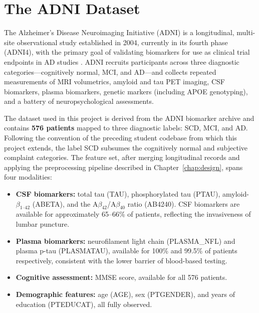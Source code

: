 \documentclass[12pt, a4paper]{report}
\begin{document}
  \section{The ADNI Dataset}
  \label{sec:adni}

  The Alzheimer's Disease Neuroimaging Initiative (ADNI) is a longitudinal,
  multi-site observational study established in 2004, currently in its fourth phase
  (ADNI4), with the primary goal of validating biomarkers for use as clinical trial
  endpoints in AD studies \citep{weiner2017adni}. ADNI recruits participants across
  three diagnostic categories---cognitively normal, MCI, and AD---and collects
  repeated measurements of MRI volumetrics, amyloid and tau PET imaging, CSF
  biomarkers, plasma biomarkers, genetic markers (including APOE genotyping), and a
  battery of neuropsychological assessments.

  The dataset used in this project is derived from the ADNI biomarker archive and
  contains \textbf{576 patients} mapped to three diagnostic labels: SCD, MCI, and AD.
  Following the convention of the preceding student codebase from which this project
  extends, the label SCD subsumes the cognitively normal and subjective complaint
  categories. The feature set, after merging longitudinal records and applying the
  preprocessing pipeline described in Chapter~\ref{chap:design}, spans four
  modalities:

  \begin{itemize}[nosep]
    \item \textbf{CSF biomarkers:} total tau (TAU), phosphorylated tau (PTAU),
      amyloid-$\beta_{1\text{--}42}$ (ABETA), and the A$\beta_{42}$/A$\beta_{40}$
      ratio (AB4240). CSF biomarkers are available for approximately 65--66\% of
      patients, reflecting the invasiveness of lumbar puncture.
    \item \textbf{Plasma biomarkers:} neurofilament light chain (PLASMA\_NFL) and
      plasma p-tau (PLASMATAU), available for 100\% and 99.5\% of patients
      respectively, consistent with the lower barrier of blood-based testing.
    \item \textbf{Cognitive assessment:} MMSE score, available for all 576 patients.
    \item \textbf{Demographic features:} age (AGE), sex (PTGENDER), and years of
      education (PTEDUCAT), all fully observed.
  \end{itemize}
\end{document}
